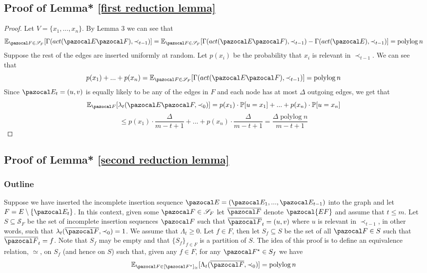 \documentclass{report}
\DeclareMathOperator*{\polylog}{polylog}
\begin{document}
\subsection{Proof of Lemma* \ref{first reduction lemma}}

\begin{proof}
Let $V=\{x_1,...,x_n\}$. By Lemma 3 we can see that
\[ \mathbb E_{\pazocal F \in \mathcal S_F}[\Gamma(act(\pazocal E \pazocal F), \prec_{t-1})] = \mathbb E_{\pazocal F \in \mathcal S_F}[\Gamma(act(\pazocal E \pazocal F), \prec_{t-1}) - \Gamma(act(\pazocal E), \prec_{t-1})] = \polylog n \] 
Suppose the rest of the edges are inserted uniformly at random. Let $p(x_i)$ be the probability that $x_i$ is relevant in $\prec_{t-1}$. We can see that
\[ p(x_1) +...+p(x_n) =  \mathbb E_{\pazocal F \in \mathcal S_F}[\Gamma(act(\pazocal E \pazocal F), \prec_{t-1})] = \polylog n \]
Since $\pazocal E_t=(u,v)$ is equally likely to be any of the edges in $F$ and each node has at most $\Delta$ outgoing edges, we get that
\[ \mathbb E_{\pazocal F}[\lambda_t(\pazocal E \pazocal F, \prec_0)] = p(x_1) \cdot \mathbb P[u=x_1]+...+ p(x_n) \cdot \mathbb P[u=x_n]\]
\[ \leq p(x_1) \cdot \frac{\Delta}{m-t+1}+...+ p(x_n) \cdot \frac{\Delta}{m-t+1} =\frac{\Delta\polylog n}{m-t+1}\]
\end{proof}

\subsection{Proof of Lemma* \ref{second reduction lemma}}

\subsubsection{Outline}

Suppose we have inserted the incomplete insertion sequence $\pazocal E = (\pazocal E_1,...,\pazocal E_{t-1})$ into the graph and let $F=E \setminus \{\pazocal E_t\}$. In this context, given some $\pazocal F \in \mathcal S_F$ let $\overline{\pazocal F}$ denote $\pazocal{EF}$ and assume that $t \leq m$. Let $S \subseteq \mathcal S_F$ be the set of incomplete insertion sequences $\pazocal F$ such that $\overline{\pazocal F}_t=(u,v)$ where $u$ is relevant in $\prec_{t-1}$, in other words, such that $\lambda_t(\overline{\pazocal F}, \prec_0)=1$. We assume that $\Lambda_t \geq 0$. Let $f \in F$, then let $S_f \subseteq S$ be the set of all $\pazocal F \in S$ such that $\overline{\pazocal F}_t = f$. Note that $S_f$ may be empty and that $\{ S_f \}_{f \in F}$ is a partition of $S$. The idea of this proof is to define an equivalence relation, $\simeq$, on $S_f$ (and hence on $S$) such that, given any $f \in F$, for any $\pazocal F^\star \in S_f$ we have
\[ \mathbb E_{\pazocal F \in [\pazocal F^\star]_{\simeq}}[\Lambda_t(\overline{\pazocal F}, \prec_0)] = \polylog n \]
\end{document}
